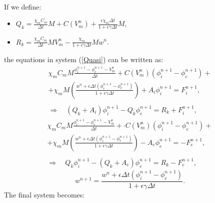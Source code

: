 \documentclass[a4paper,11pt]{article}
\begin{document}
\vspace{2mm} \\
If we define:
\begin{itemize}
\item $Q_k = \frac{\chi_m C_m}{\Delta t}M + C(V_m^n) + \frac{\epsilon\chi_m \Delta t}{1 + \epsilon \gamma \Delta t} M$,
\item $R_k = \frac{\chi_mC_m}{\Delta t}MV_m^n - \frac{\chi_m}{1+\epsilon\gamma\Delta t}M w^n$.
\end{itemize}
\vspace{4mm}
the equations in system (\ref{Quasi}) can be written as:
\begin{equation}
\begin{gathered}
\chi_m C_m M \frac{	\phi_i^{n+1}-\phi_e^{n+1}-V_m^{n}}{\Delta t} +  C(V_m^n) (\phi_i^{n+1}-\phi_e^{n+1}) + \\
 +\chi_m M \left(\frac{w^n + \epsilon \Delta t (\phi_i^{n+1}-\phi_e^{n+1})}{1+\epsilon \gamma \Delta t}   \right)
+ A_i \phi_i ^{n+1} = F_i^{n+1}, \\ \\
\Rightarrow \quad (Q_k + A_i) \phi_i^{n+1} - Q_k \phi_e^{n+1} =R_k +  F_i^{n+1},
\end{gathered}
\end{equation}
\vspace{3mm}
\begin{equation}
\begin{gathered}
\chi_m C_m M \frac{	\phi_i^{n+1}-\phi_e^{n+1}-V_m^{n}}{\Delta t} + \cdot C(V_m^n) (\phi_i^{n+1}-\phi_e^{n+1}) +\\ 
+ \chi_m M \left(\frac{w^n + \epsilon \Delta t (\phi_i^{n+1}-\phi_e^{n+1})}{1+\epsilon \gamma \Delta t}   \right)
- A_e \phi_e ^{n+1} = -F_e^{n+1}, \\ \\
\Rightarrow \quad Q_k \phi_i^{n+1} - (Q_k+A_e) \phi_e^{n+1} =R_k - F_e^{n+1},
\end{gathered}
\end{equation}
\vspace{3mm}
\begin{equation}
w^{n+1} = \frac{w^n + \epsilon \Delta t (\phi_i^{n+1}-\phi_e^{n+1})}{1+\epsilon \gamma \Delta t}.
\end{equation}
The final system becomes: \\
\end{document}
